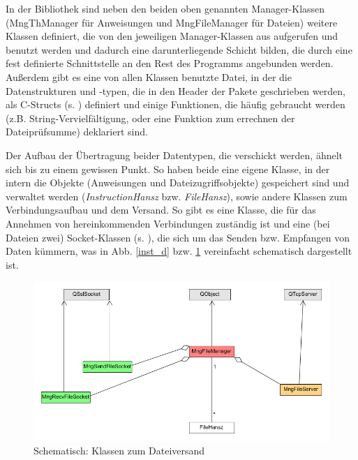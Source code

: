 In der Bibliothek sind neben den beiden oben genannten Manager-Klassen (MngThManager für Anweisungen und MngFileManager für Dateien) weitere Klassen definiert, die von den jeweiligen Manager-Klassen aus aufgerufen und benutzt werden und dadurch eine darunterliegende Schicht bilden, die durch eine fest definierte Schnittstelle an den Rest des Programms angebunden werden.
Außerdem gibt es eine von allen Klassen benutzte Datei, in der die Datenstrukturen und -typen, die in den Header der Pakete geschrieben werden, als C-Structs (s. ) definiert und einige Funktionen, die häufig gebraucht werden (z.B. String-Vervielfältigung, oder eine Funktion zum errechnen der Dateiprüfsumme) deklariert sind.\par
Der Aufbau der Übertragung beider Datentypen, die verschickt werden, ähnelt sich bis zu einem gewissen Punkt. 
So haben beide eine eigene Klasse, in der intern die Objekte (Anweisungen und Dateizugriffsobjekte) gespeichert sind und verwaltet werden (\textit{InstructionHansz} bzw. \textit{FileHansz}), sowie andere Klassen zum Verbindungsaufbau und dem Versand. 
So gibt es eine Klasse, die für das Annehmen von hereinkommenden Verbindungen zuständig ist und eine (bei Dateien zwei) Socket-Klassen (s. ), die sich um das Senden bzw. Empfangen von Daten kümmern, was in Abb. \ref{inst_d} bzw. \ref{file_d} vereinfacht schematisch dargestellt ist.\\

\begin{figure}
\includegraphics[scale=.35]{classDiagFile}
\caption{Schematisch: Klassen zum Dateiversand}
\label{file_d}
\end{figure}

